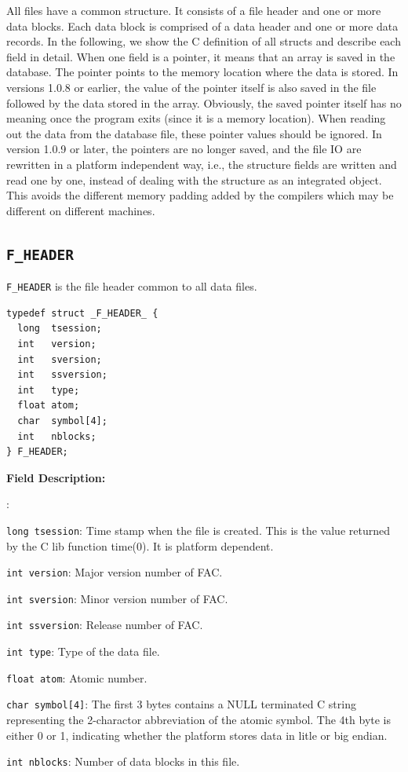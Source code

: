 \documentclass[twoside,letterpaper]{refrep}
\newenvironment{dbdesc}{\textbf{Field Description:} \begin{list}
	{:}{\setlength{\labelwidth}{2in}
	   \setlength{\leftmargin}{2in}
	   \setlength{\labelsep}{0.1in}
	   \setlength{\rightmargin}{0.2in}}}
	{\end{list}}
\begin{document}
All files have a common structure. It consists of a file header and one or
more data blocks. Each data block is comprised of a data header and one or
more data records. In the following, we show the C definition of all structs
and describe each field in detail. When one field is a pointer, it means that
an array is saved in the database. The pointer points to the memory location
where the data is stored. In versions 1.0.8 or earlier, the value of the
pointer itself is also saved in the file followed by the data stored in the
array. Obviously, the saved pointer itself has no meaning once the program
exits (since it is a memory location). When reading out the data from the
database file, these pointer values should be ignored. In version 1.0.9 or
later, the pointers are no longer saved, and the file IO are rewritten in a
platform independent way, i.e., the structure fields are written and read one
by one, instead of dealing with the structure as an integrated object. This
avoids the different memory padding added by the compilers which may be
different on different machines.

\subsection{\texttt{F\_HEADER}}
\texttt{F\_HEADER} is the file header common to all data files. 

\begin{verbatim}
typedef struct _F_HEADER_ {
  long  tsession;
  int   version;
  int   sversion;
  int   ssversion;
  int   type;
  float atom;
  char  symbol[4];
  int   nblocks;
} F_HEADER;
\end{verbatim}

\begin{dbdesc}
\item[\texttt{long tsession}:] Time stamp when the file is created. This is the
value returned by the C lib function time(0). It is platform dependent. 
\item[\texttt{int version}:] Major version number of FAC.
\item[\texttt{int sversion}:] Minor version number of FAC.
\item[\texttt{int ssversion}:] Release number of FAC.
\item[\texttt{int type}:] Type of the data file.
\item[\texttt{float atom}:] Atomic number.
\item[\texttt{char symbol[4]}:] The first 3 bytes contains a NULL
terminated C string representing the 2-charactor abbreviation of the atomic
symbol. The 4th byte is either 0 or 1, indicating whether the platform stores
data in litle or big endian.
\item[\texttt{int nblocks}:] Number of data blocks in this file.
\end{dbdesc}
\end{document}
